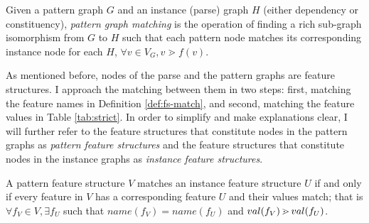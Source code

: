     \begin{definition}\label{def:pgmatching}
        Given a pattern graph $G$ and an instance (parse) graph $H$ (either dependency or constituency), \textit{pattern graph matching} is the operation of finding a rich sub-graph isomorphism from $G$ to $H$ such that each pattern node matches its corresponding instance node for each $H$, $\forall v \in V_G, v \gtrdot f(v)$.
    \end{definition}


    As mentioned before, nodes of the parse and the pattern graphs are feature structures. I approach the matching between them in two steps: first, matching the feature names in Definition \ref{def:fs-match}, and second,  matching the feature values in Table \ref{tab:strict}. In order to simplify and make explanations clear, I will further refer to the feature structures that constitute nodes in the pattern graphs as \textit{pattern feature structures} and the feature structures that constitute nodes in the instance graphs as \textit{instance feature structures}.

    \begin{definition}\label{def:fs-match}
        A pattern feature structure $V$ matches an instance feature structure $U$ if and only if every feature in $V$ has a corresponding feature $U$ and their values match; that is $ \forall f_V \in V, \exists f_U$ such that $name(f_V) = name(f_U)$ and $ val(f_V) \operatorname{\gtrdot} val(f_U)$.
    \end{definition}

